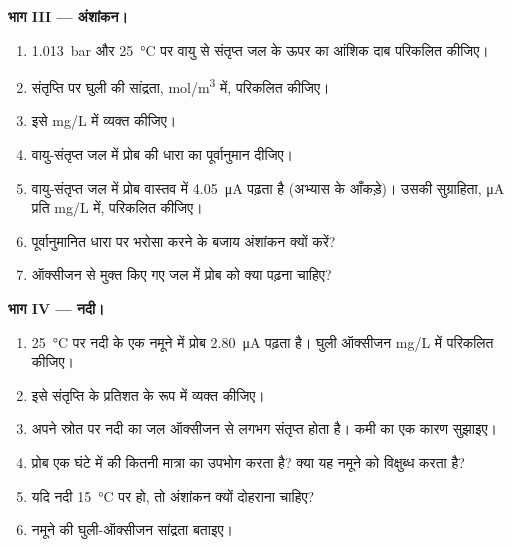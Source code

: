 \begin{problem}
\medskip
\noindent\textbf{भाग III --- अंशांकन।}
\begin{enumerate}[resume]
  \item \qty{1.013}{bar} और \qty{25}{\degreeCelsius} पर वायु से संतृप्त जल के ऊपर
         का आंशिक दाब परिकलित कीजिए।
  \item संतृप्ति पर घुली  की सांद्रता, \unit{mol/m^3} में,
        परिकलित कीजिए।
  \item इसे \unit{mg/L} में व्यक्त कीजिए।
  \item वायु-संतृप्त जल में प्रोब की धारा का पूर्वानुमान दीजिए।
  \item वायु-संतृप्त जल में प्रोब वास्तव में \qty{4.05}{\micro A} पढ़ता है
        (अभ्यास के आँकड़े)। उसकी सुग्राहिता, \unit{\micro A} प्रति
        \unit{mg/L} में, परिकलित कीजिए।
  \item पूर्वानुमानित धारा पर भरोसा करने के बजाय अंशांकन क्यों करें?
  \item ऑक्सीजन से मुक्त किए गए जल में प्रोब को क्या पढ़ना चाहिए?
\end{enumerate}

\medskip
\noindent\textbf{भाग IV --- नदी।}
\begin{enumerate}[resume]
  \item \qty{25}{\degreeCelsius} पर नदी के एक नमूने में प्रोब
        \qty{2.80}{\micro A} पढ़ता है। घुली ऑक्सीजन \unit{mg/L} में परिकलित कीजिए।
  \item इसे संतृप्ति के प्रतिशत के रूप में व्यक्त कीजिए।
  \item अपने स्रोत पर नदी का जल ऑक्सीजन से लगभग संतृप्त होता है।
        कमी का एक कारण सुझाइए।
  \item प्रोब एक घंटे में  की कितनी मात्रा का उपभोग करता है? क्या यह
        नमूने को विक्षुब्ध करता है?
  \item यदि नदी \qty{15}{\degreeCelsius} पर हो, तो अंशांकन क्यों दोहराना चाहिए?
  \item नमूने की घुली-ऑक्सीजन सांद्रता बताइए।
\end{enumerate}
\end{problem}
